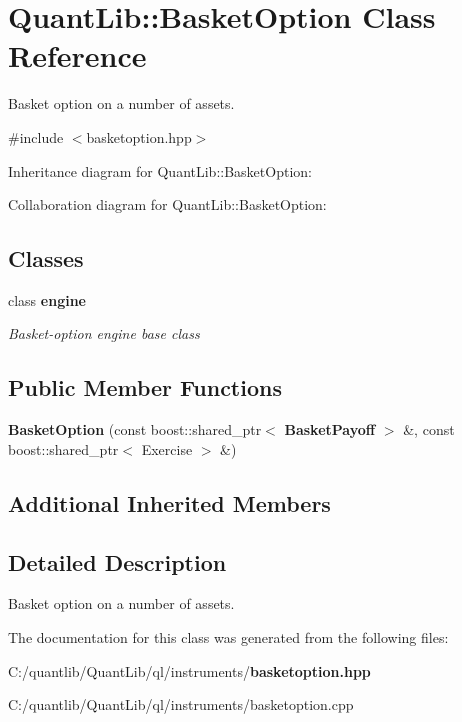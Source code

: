 \section{Quant\+Lib\+:\+:Basket\+Option Class Reference}
\label{class_quant_lib_1_1_basket_option}


Basket option on a number of assets.  




{\ttfamily \#include $<$basketoption.\+hpp$>$}



Inheritance diagram for Quant\+Lib\+:\+:Basket\+Option\+:


Collaboration diagram for Quant\+Lib\+:\+:Basket\+Option\+:
\subsection*{Classes}
\begin{DoxyCompactItemize}
\item 
class {\bf engine}
\begin{DoxyCompactList}\small\item\em Basket-\/option engine base class \end{DoxyCompactList}\end{DoxyCompactItemize}
\subsection*{Public Member Functions}
\begin{DoxyCompactItemize}
\item 
{\bfseries Basket\+Option} (const boost\+::shared\+\_\+ptr$<$ {\bf Basket\+Payoff} $>$ \&, const boost\+::shared\+\_\+ptr$<$ Exercise $>$ \&)\label{class_quant_lib_1_1_basket_option_ab6e03d56e516b0bf8238b4aeb3b4fa23}

\end{DoxyCompactItemize}
\subsection*{Additional Inherited Members}


\subsection{Detailed Description}
Basket option on a number of assets. 



The documentation for this class was generated from the following files\+:\begin{DoxyCompactItemize}
\item 
C\+:/quantlib/\+Quant\+Lib/ql/instruments/{\bf basketoption.\+hpp}\item 
C\+:/quantlib/\+Quant\+Lib/ql/instruments/basketoption.\+cpp\end{DoxyCompactItemize}
